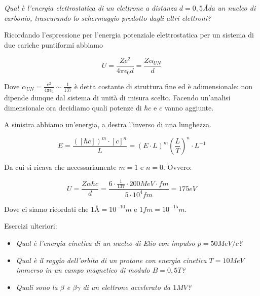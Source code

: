 \emph{Qual è l'energia elettrostatica di un elettrone a distanza $d=0,5$\AA da un nucleo di carbonio, trascurando lo schermaggio prodotto dagli altri elettroni?}

Ricordando l'espressione per l'energia potenziale elettrostatica per un sistema di due cariche puntiformi abbiamo

\begin{equation}
U=\frac{Ze^2}{4\pi\epsilon_0d}=\frac{Z\alpha_{UN}}{d}
\end{equation}

Dove $\alpha_{UN}=\frac{e^2}{4\pi\epsilon_0}\sim\frac{1}{137}$ è detta costante di struttura fine ed è adimensionale: non dipende dunque dal sistema di unità di misura scelto. Facendo un'analisi dimensionale ora decidiamo quali potenze di $\hbar c$ e $c$ vanno aggiunte.

A sinistra abbiamo un'energia, a destra l'inverso di una lunghezza.

\begin{equation}
E=\frac{([\hbar c])^m \cdot [c]^n}{L}=(E\cdot L)^m\left(\frac{L}{T}\right)^n\cdot L^{-1}
\end{equation}

Da cui si ricava che necessariamente $m=1$ e $n=0$. Ovvero:

\begin{equation}
U=\frac{Z\alpha\hbar c}{d}=\frac{6\cdot\frac{1}{137}\cdot200MeV\cdot fm}{5\cdot 10^4 fm}=175eV
\end{equation}

Dove ci siamo ricordati che 1\AA$=10^{-10}m$ e $1 fm=10^{-15}m$.

Esercizi ulteriori:

\begin{itemize}
\item \emph{Qual è l'energia cinetica di un nucleo di Elio con impulso $p=50MeV/c$?}
\item \emph{Qual è il raggio dell'orbita di un protone con energia cinetica $T=10MeV$ immerso in un campo magnetico di modulo $B=0,5 T$?}
\item \emph{Quali sono la $\beta$ e $\beta\gamma$ di un elettrone accelerato da $1 MV$?}
\end{itemize}

